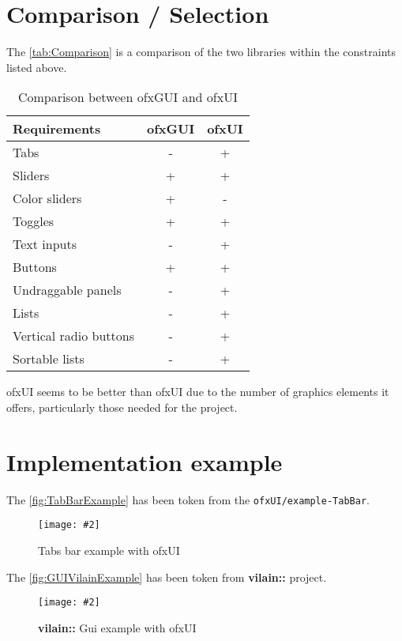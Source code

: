 \documentclass[a4paper,titlepage,oneside]{article}
\newcommand{\image}[5][\textwidth]{%
    \begin{figure}[h]
        \centering
            \begin{minipage}[c]{#1}
                \centering
                \texttt{[image: \#2]}
                \caption{#4}
                \label{#5}
            \end{minipage}
    \end{figure}
}
\newcommand{\tableau}[4]{
    \begin{table}[h]
        \centering
        \begin{tabular}{#1}
            #4
        \end{tabular}
        \caption{#2}
        \label{#3}
    \end{table}
}
\newcommand{\vilain}{\textbf{vilain::}}
\begin{document}
\section{Comparison / Selection}
The \tablename \vref{tab:Comparison} is a comparison of the two libraries within the constraints listed above.\\
\tableau{|p{4cm}|c|c|}{Comparison between ofxGUI and ofxUI}{tab:Comparison}{
  \hline
  Requirements & ofxGUI & ofxUI\\
  \hline
  Tabs & - & + \\
  Sliders & + & + \\
  Color sliders & + & - \\
  Toggles & + & + \\
  Text inputs & - & + \\
  Buttons & + & + \\
  Undraggable panels & - & + \\
  Lists & - & + \\
  Vertical radio buttons & - & + \\
  Sortable lists & - & + \\
  \hline
}

ofxUI seems to be better than ofxUI due to the number of graphics
elements it offers, particularly those needed for the project.

\section{Implementation example}
The \figurename \vref{fig:TabBarExample} has been token from the
\texttt{ofxUI/example-TabBar}.
\image{data/TabBar.jpg}{width=5cm}{Tabs bar example with
  ofxUI}{fig:TabBarExample}
The \figurename \vref{fig:GUIVilainExample} has been token from \vilain{} project.
\image{data/GUIVilain.jpg}{width=13cm}{\vilain{} Gui example with
  ofxUI}{fig:GUIVilainExample}
\end{document}
